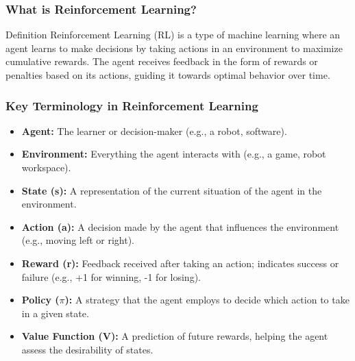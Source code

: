 \documentclass[aspectratio=169]{beamer}
\begin{document}
\begin{frame}[fragile]
    \frametitle{What is Reinforcement Learning?}
    \begin{block}{Definition}
        Reinforcement Learning (RL) is a type of machine learning where an agent learns to make decisions by taking actions in an environment to maximize cumulative rewards. The agent receives feedback in the form of rewards or penalties based on its actions, guiding it towards optimal behavior over time.
    \end{block}
\end{frame}

\begin{frame}[fragile]
    \frametitle{Key Terminology in Reinforcement Learning}
    \begin{itemize}
        \item \textbf{Agent:} The learner or decision-maker (e.g., a robot, software).
        \item \textbf{Environment:} Everything the agent interacts with (e.g., a game, robot workspace).
        \item \textbf{State (s):} A representation of the current situation of the agent in the environment.
        \item \textbf{Action (a):} A decision made by the agent that influences the environment (e.g., moving left or right).
        \item \textbf{Reward (r):} Feedback received after taking an action; indicates success or failure (e.g., +1 for winning, -1 for losing).
        \item \textbf{Policy ($\pi$):} A strategy that the agent employs to decide which action to take in a given state.
        \item \textbf{Value Function (V):} A prediction of future rewards, helping the agent assess the desirability of states.
    \end{itemize}
\end{frame}
\end{document}
